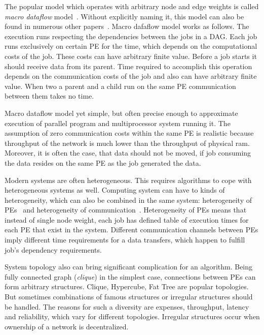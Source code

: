 The popular model which operates with arbitrary node and edge weights
is called \emph{macro dataflow}
model~\cite{yang1992pyrros,wu1990hypertool}.  Without explicitly
naming it, this model can also be found in numerous other
papers~\cite{adam1974, kwok1999static, sakellariou2004low}. Macro dafaflow
model works as follows. The execution runs respecting the dependencies
between the jobs in a DAG. Each job runs exclusively on certain PE for
the time, which depends on the computational  costs of the job. These costs can have arbitrary
finite value. Before a job starts it should receive data from its
parent. Time required to accomplish this operation depends on the
communication costs of the job and also can have arbitrary finite
value. When two a parent and a child run on the same PE communication
between them takes no time.

Macro dataflow model yet simple, but often precise enough to
approximate execution of parallel program and multiprocessor system
running it. The assumption of zero communication costs within the same
PE is realistic because throughput of the network is much lower than
the throughput of physical ram. Moreover, it is often the case, that
data should not be moved, if job consuming the data resides on the
same PE as the job generated the data.

Modern systems are often heterogeneous. This requires algorithms to
cope with heterogeneous systems as well. Computing system can have to
kinds of heterogeneity, which can also be combined in the same system:
heterogeneity of PEs~\cite{grajcar1999genetic, Topcuoglu2002,
  arabnejad2014list} and heterogeneity of
communication~\cite{arabnejad2014list,
  bittencourt2010dag}. Heterogeneity of PEs means that instead of
single node weight, each job has defined table of execution times for
each PE that exist in the system. Different communication channels
between PEs imply different time requirements for a data transfers,
which happen to fulfill job's dependency requirements.

System topology also can bring significant complication for an
algorithm. Being fully connected graph (\emph{clique}) in the simplest
case, connections between PEs can form arbitrary structures. Clique,
Hypercube, Fat Tree are popular topologies. But sometimes combinations
of famous structures or irregular structures should be handled. The
reasons for such a diversity are expenses, throughput, latency and
reliability, which vary for different topologies. Irregular structures occur
when ownership of a network is decentralized.


